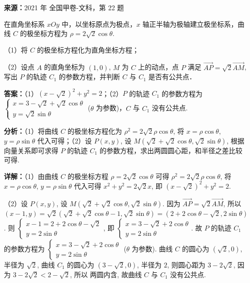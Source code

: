 \begin{question}[points=10]
\textbf{来源：}2021 年 全国甲卷-文科，第 22 题\par
[选修4-4：坐标系与参数方程]



在直角坐标系 $xOy$ 中，以坐标原点为极点，$x$ 轴正半轴为极轴建立极坐标系，曲线 $C$ 的极坐标方程为 $\rho = 2\sqrt{2}\cos\theta$.



（1）将 $C$ 的极坐标方程化为直角坐标方程；



（2）设点 $A$ 的直角坐标为 $(1,0)$, $M$ 为 $C$ 上的动点，点 $P$ 满足 $\overrightarrow{AP} = \sqrt{2}\overrightarrow{AM}$, 写出 $P$ 的轨迹 $C_1$ 的参数方程，并判断 $C$ 与 $C_1$ 是否有公共点．
\begin{solution}
\textbf{答案：}（1）$(x-\sqrt{2})^2 + y^2 = 2$；（2）$P$ 的轨迹 $C_1$ 的参数方程为 $\begin{cases} x = 3 - \sqrt{2} + \sqrt{2}\cos\theta \\ y = \sqrt{2}\sin\theta \end{cases}$ ($\theta$ 为参数)，$C$ 与 $C_1$ 没有公共点.

\textbf{分析：}（1）将曲线 $C$ 的极坐标方程化为 $\rho^2 = 2\sqrt{2}\rho\cos\theta$, 将 $x=\rho\cos\theta$, $y=\rho\sin\theta$ 代入可得；（2）设 $P(x,y)$, 设 $M(\sqrt{2}+\sqrt{2}\cos\theta, \sqrt{2}\sin\theta)$, 根据向量关系即可求得 $P$ 的轨迹 $C_1$ 的参数方程，求出两圆圆心距，和半径之差比较可得.

\textbf{详解：}（1）由曲线 $C$ 的极坐标方程 $\rho = 2\sqrt{2}\cos\theta$ 可得 $\rho^2 = 2\sqrt{2}\rho\cos\theta$, 将 $x=\rho\cos\theta$, $y=\rho\sin\theta$ 代入可得 $x^2+y^2 = 2\sqrt{2}x$, 即 $(x-\sqrt{2})^2 + y^2 = 2$.

（2）设 $P(x,y)$, 设 $M(\sqrt{2}+\sqrt{2}\cos\theta, \sqrt{2}\sin\theta)$. 因为 $\overrightarrow{AP} = \sqrt{2}\overrightarrow{AM}$, 所以 $(x-1, y) = \sqrt{2}(\sqrt{2}+\sqrt{2}\cos\theta - 1, \sqrt{2}\sin\theta) = (2+2\cos\theta - \sqrt{2}, 2\sin\theta)$. 则 $\begin{cases} x-1 = 2+2\cos\theta - \sqrt{2} \\ y = 2\sin\theta \end{cases}$, 即 $\begin{cases} x = 3 - \sqrt{2} + 2\cos\theta \\ y = 2\sin\theta \end{cases}$. 故 $P$ 的轨迹 $C_1$ 的参数方程为 $\begin{cases} x = 3 - \sqrt{2} + 2\cos\theta \\ y = 2\sin\theta \end{cases}$ ($\theta$ 为参数). 曲线 $C$ 的圆心为 $(\sqrt{2},0)$, 半径为 $\sqrt{2}$, 曲线 $C_1$ 的圆心为 $(3-\sqrt{2},0)$, 半径为 $2$, 则圆心距为 $3-2\sqrt{2}$, 因为 $3-2\sqrt{2} < 2 - \sqrt{2}$, 所以 两圆内含, 故曲线 $C$ 与 $C_1$ 没有公共点.
\end{solution}
\end{question}

